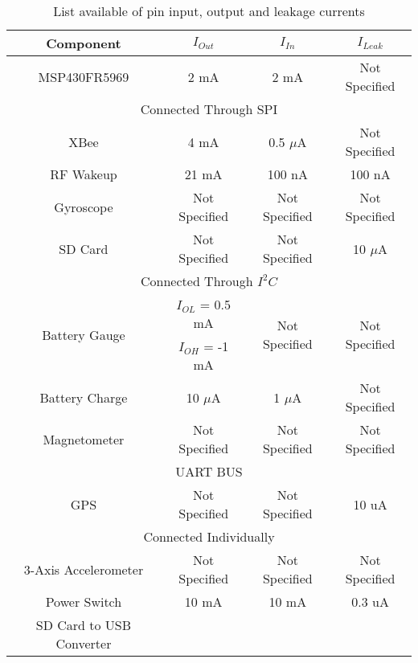\begin{table}[H]
  \centering
  \caption{List available of pin input, output and leakage currents}
    \begin{tabular}{|c|c|c|c|}
    \hline
    Component & $I_{Out}$  & $I_{In}$   & $I_{Leak}$ \\
    \hline\hline
    MSP430FR5969 & 2 mA  & 2 mA  & Not Specified \\ \hline

    \multicolumn{4}{|c|}{Connected Through SPI} \\ \hline
    XBee  & 4 mA  & 0.5 $\mu$A & Not Specified \\ \hline
    RF Wakeup & 21 mA  & 100 nA & 100 nA \\ \hline
    Gyroscope & Not Specified & Not Specified & Not Specified \\ \hline
    SD Card & Not Specified & Not Specified & 10 $\mu$A \\ \hline

    \multicolumn{4}{|c|}{Connected Through $I^2C$} \\ \hline
    \multirow{2}{*}{Battery Gauge} & $I_{OL}$ = 0.5 mA & \multirow{2}{*}{Not Specified} & \multirow{2}{*}{Not Specified} \\
    & $I_{OH}$ = -1 mA & &\\ \hline
    Battery Charge & 10 $\mu$A  & 1 $\mu$A  & Not Specified \\ \hline
    Magnetometer & Not Specified & Not Specified & Not Specified \\ \hline
    
    \multicolumn{4}{|c|}{UART BUS} \\ \hline
    GPS   & Not Specified & Not Specified & 10 uA \\ \hline
   
    \multicolumn{4}{|c|}{Connected Individually} \\ \hline
    3-Axis Accelerometer & Not Specified & Not Specified & Not Specified \\ \hline
    Power Switch & 10 mA & 10 mA & 0.3 uA \\ \hline
 	SD Card to USB Converter &       &       &  \\
    \hline
    \end{tabular}%
  \label{tab:drivingCap}
\end{table}%


